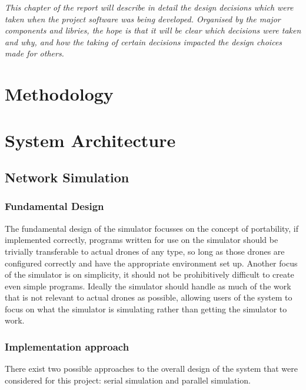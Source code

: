 \emph{This chapter of the report will describe in detail the design decisions which were taken when the project software was being developed. Organised by the major components and libries, the hope is that it will be clear which decisions were taken and why, and how the taking of certain decisions impacted the design choices made for others.}

\section{Methodology}

\section{System Architecture}

\subsection{Network Simulation}

\subsubsection{Fundamental Design}
The fundamental design of the simulator focusses on the concept of portability, if implemented correctly, programs written for use on the simulator should be trivially transferable to actual drones of any type, so long as those drones are configured correctly and have the appropriate environment set up. Another focus of the simulator is on simplicity, it should not be prohibitively difficult to create even simple programs. Ideally the simulator should handle as much of the work that is not relevant to actual drones as possible, allowing users of the system to focus on what the simulator is simulating rather than getting the simulator to work.

\subsubsection{Implementation approach}
There exist two possible approaches to the overall design of the system that were considered for this project: serial simulation and parallel simulation.


